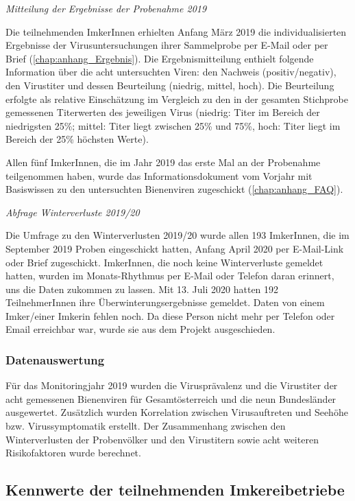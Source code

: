 \textit{Mitteilung der Ergebnisse der Probenahme 2019}

Die teilnehmenden ImkerInnen erhielten Anfang März 2019 die individualisierten Ergebnisse der Virusuntersuchungen ihrer Sammelprobe per E-Mail oder per Brief (\cref{chap:anhang_Ergebnis}). Die Ergebnismitteilung enthielt folgende Information über die acht untersuchten Viren: den Nachweis (positiv/negativ), den Virustiter und dessen Beurteilung (niedrig, mittel, hoch). Die Beurteilung erfolgte als relative Einschätzung im Vergleich zu den in der gesamten Stichprobe gemessenen Titerwerten des jeweiligen Virus (niedrig: Titer im Bereich der niedrigsten 25\%; mittel: Titer liegt zwischen 25\% und 75\%, hoch: Titer liegt im Bereich der 25\% höchsten Werte).

Allen fünf ImkerInnen, die im Jahr 2019 das erste Mal an der Probenahme teilgenommen haben, wurde das Informationsdokument vom Vorjahr mit Basiswissen zu den untersuchten Bienenviren  zugeschickt (\cref{chap:anhang_FAQ}).


\textit{Abfrage Winterverluste 2019/20}

Die Umfrage zu den Winterverlusten 2019/20 wurde allen 193 ImkerInnen, die im September 2019 Proben eingeschickt hatten, Anfang April 2020 per E-Mail-Link oder Brief zugeschickt. ImkerInnen, die noch keine Winterverluste gemeldet hatten, wurden im Monats-Rhythmus per E-Mail oder Telefon daran erinnert, uns die Daten zukommen zu lassen. Mit 13. Juli 2020 hatten 192 TeilnehmerInnen ihre Überwinterungsergebnisse gemeldet. Daten von einem Imker/einer Imkerin fehlen noch. Da diese Person nicht mehr per Telefon oder Email erreichbar war, wurde sie aus dem Projekt ausgeschieden.

\subsubsection{Datenauswertung}

Für das Monitoringjahr 2019 wurden die Virusprävalenz und die Virustiter der acht gemessenen Bienenviren für Gesamtösterreich und die neun Bundesländer ausgewertet. Zusätzlich wurden Korrelation zwischen Virusauftreten und Seehöhe bzw. Virussymptomatik erstellt.  Der Zusammenhang zwischen den Winterverlusten der Probenvölker und den Virustitern sowie acht weiteren Risikofaktoren wurde berechnet. 

\subsection{Kennwerte der teilnehmenden Imkereibetriebe}

